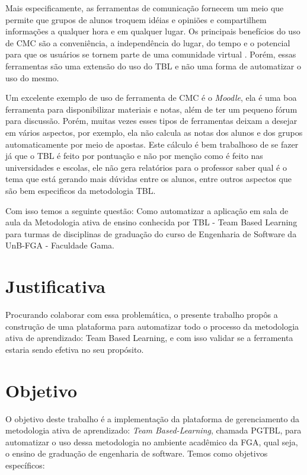 Mais especificamente, as ferramentas de comunicação fornecem um meio que permite que grupos de alunos troquem idéias e opiniões e compartilhem informações a qualquer hora e em qualquer lugar. Os principais benefícios do uso de CMC são a conveniência, a independência do lugar, do tempo e o potencial para que os usuários se tornem parte de uma comunidade virtual \cite{berge}. Porém, essas ferramentas são uma extensão do uso do TBL e não uma forma de automatizar o uso do mesmo.

Um excelente exemplo de uso de ferramenta de CMC é o \textit{Moodle}, ela é uma boa ferramenta para disponibilizar materiais e notas, além de ter um pequeno fórum para discussão. Porém, muitas vezes esses tipos de ferramentas deixam a desejar em vários aspectos, por exemplo, ela não calcula as notas dos alunos e dos grupos automaticamente por meio de apostas. Este cálculo é bem trabalhoso de se fazer já que o TBL é feito por pontuação e não por menção como é feito nas universidades e escolas, ele não gera relatórios para o professor saber qual é o tema que está gerando mais dúvidas entre os alunos, entre outros aspectos que são bem especificos da metodologia TBL.

Com isso temos a seguinte questão: Como automatizar a aplicação em sala de aula da Metodologia ativa de ensino conhecida por TBL - Team Based Learning para turmas de disciplinas de graduação do curso de Engenharia de Software da UnB-FGA - Faculdade Gama.

\section{Justificativa}

Procurando colaborar com essa problemática, o presente trabalho propôs a construção de uma plataforma para automatizar todo o processo da metodologia ativa de aprendizado: Team Based Learning, e com isso validar se a ferramenta estaria sendo efetiva no seu propósito.

\section{Objetivo}

O objetivo deste trabalho é a implementação da plataforma de gerenciamento da metodologia ativa de aprendizado: \textit{Team Based-Learning}, chamada PGTBL, para automatizar o uso dessa metodologia no ambiente acadêmico da FGA, qual seja, o ensino de graduação de engenharia de software. Temos como objetivos específicos:


